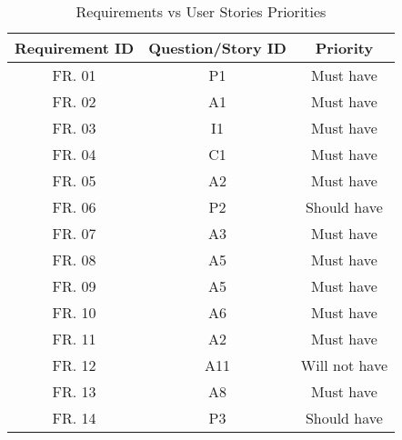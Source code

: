 \begin{table}[!htb]
  \centering
  \setlength{\aboverulesep}{0pt}
  \setlength{\belowrulesep}{0pt}
  \caption{Requirements vs User Stories Priorities}
  \label{tab:stories-requirements-relation}
  \footnotesize
  \begin{tabular}{c|c|c}
    \toprule
    \rowcolor[rgb]{0.753,0.753,0.753} \textbf{Requirement ID} & \textbf{Question/Story ID} & \textbf{Priority} \\
    \hline
    \rowcolor[rgb]{0.898,0.898,0.898} FR. 01                  & P1                         & Must have         \\
    FR. 02                                                    & A1                         & Must have         \\
    \rowcolor[rgb]{0.898,0.898,0.898} FR. 03                  & I1                         & Must have         \\
    FR. 04                                                    & C1                         & Must have         \\
    \rowcolor[rgb]{0.898,0.898,0.898} FR. 05                  & A2                         & Must have         \\
    FR. 06                                                    & P2                         & Should have       \\
    \rowcolor[rgb]{0.898,0.898,0.898} FR. 07                  & A3                         & Must have         \\
    FR. 08                                                    & A5                         & Must have         \\
    \rowcolor[rgb]{0.898,0.898,0.898} FR. 09                  & A5                         & Must have         \\
    FR. 10                                                    & A6                         & Must have         \\
    \rowcolor[rgb]{0.898,0.898,0.898} FR. 11                  & A2                         & Must have         \\
    FR. 12                                                    & A11                        & Will not have     \\
    \rowcolor[rgb]{0.898,0.898,0.898} FR. 13                  & A8                         & Must have         \\
    FR. 14                                                    & P3                         & Should have       \\

\end{tabular}
\end{table}
